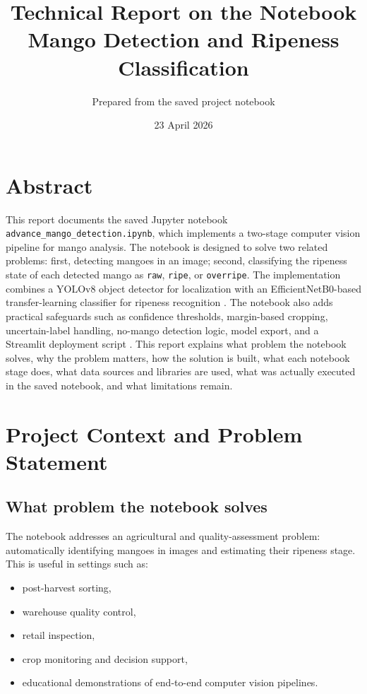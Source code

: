 \documentclass[12pt,a4paper]{article}
\title{\textbf{Technical Report on the Notebook}\\[0.3em]
\Large Mango Detection and Ripeness Classification}
\author{Prepared from the saved project notebook}
\date{23 April 2026}
\begin{document}
\maketitle
\tableofcontents
\newpage

\section{Abstract}
This report documents the saved Jupyter notebook \texttt{advance\_mango\_detection.ipynb}, which implements a two-stage computer vision pipeline for mango analysis. The notebook is designed to solve two related problems: first, detecting mangoes in an image; second, classifying the ripeness state of each detected mango as \texttt{raw}, \texttt{ripe}, or \texttt{overripe}. The implementation combines a YOLOv8 object detector for localization with an EfficientNetB0-based transfer-learning classifier for ripeness recognition \cite{ultralytics,kerasapp,efficientnet,tensorflowtransfer}. The notebook also adds practical safeguards such as confidence thresholds, margin-based cropping, uncertain-label handling, no-mango detection logic, model export, and a Streamlit deployment script \cite{streamlit}. This report explains what problem the notebook solves, why the problem matters, how the solution is built, what each notebook stage does, what data sources and libraries are used, what was actually executed in the saved notebook, and what limitations remain.

\section{Project Context and Problem Statement}
\subsection{What problem the notebook solves}
The notebook addresses an agricultural and quality-assessment problem: automatically identifying mangoes in images and estimating their ripeness stage. This is useful in settings such as:
\begin{itemize}
    \item post-harvest sorting,
    \item warehouse quality control,
    \item retail inspection,
    \item crop monitoring and decision support,
    \item educational demonstrations of end-to-end computer vision pipelines.
\end{itemize}
\end{document}
